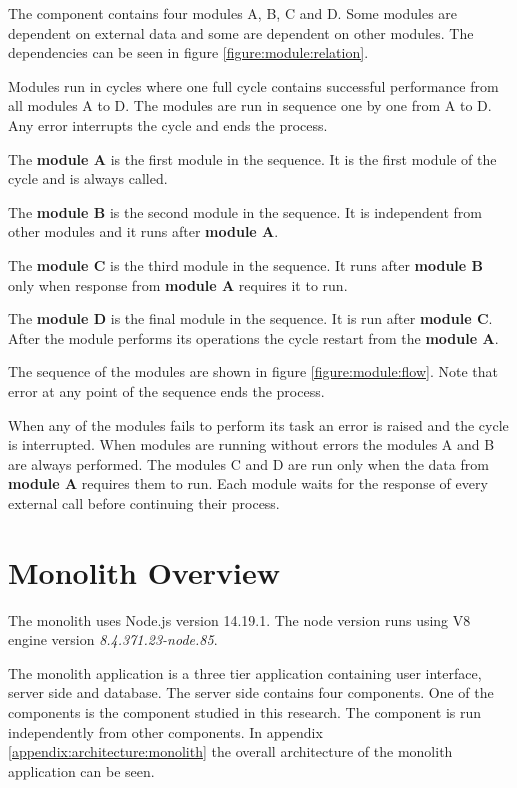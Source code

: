 The component contains four modules A, B, C and D.
Some modules are dependent on external data and some are dependent on other modules.
The dependencies can be seen in figure \ref{figure:module:relation}.

Modules run in cycles where one full cycle contains successful performance from all modules A to D.
The modules are run in sequence one by one from A to D.
Any error interrupts the cycle and ends the process.

The \textbf{module A} is the first module in the sequence.
It is the first module of the cycle and is always called.

The \textbf{module B} is the second module in the sequence.
It is independent from other modules and it runs after \textbf{module A}.

The \textbf{module C} is the third module in the sequence.
It runs after \textbf{module B} only when response from \textbf{module A} requires it to run.

The \textbf{module D} is the final module in the sequence.
It is run after \textbf{module C}.
After the module performs its operations the cycle restart from the \textbf{module A}.

The sequence of the modules are shown in figure \ref{figure:module:flow}.
Note that error at any point of the sequence ends the process.

When any of the modules fails to perform its task an error is raised and the cycle is interrupted.
When modules are running without errors the modules A and B are always performed. 
The modules C and D are run only when the data from \textbf{module A} requires them to run.
Each module waits for the response of every external call before continuing their process.

\section{Monolith Overview}
The monolith uses Node.js version 14.19.1. The node version runs using V8 engine version \textit{8.4.371.23-node.85}.

The monolith application is a three tier application containing user interface, server side and database.
The server side contains four components.
One of the components is the component studied in this research.
The component is run independently from other components.
In appendix \ref{appendix:architecture:monolith} the overall architecture of the monolith application can be seen.

